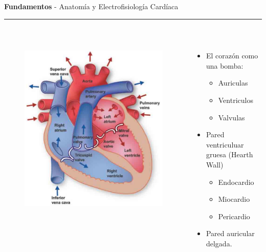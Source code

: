 \documentclass[11pt]{beamer}
\begin{document}
	\begin{frame}[t]
		\vspace*{0.5 cm} \textbf{Fundamentos} - Anatomía y Electrofisiología Cardíaca \\
		\color{brown}\rule{\linewidth}{4pt} \\ [0.5 cm]
		\begin{columns}[T] %
			\begin{column}{.48\textwidth}
				\begin{figure}
					\centering
					\includegraphics[height= 4.5 cm]{fig/fundamentals-corazon}
				\end{figure}
			\end{column}%
			\hfill%
			\begin{column}{.6\textwidth}
				\begin{itemize}
					\item El corazón como una bomba:
					\begin{itemize}
						\item Auriculas
						\item Ventriculos
						\item Valvulas
					\end{itemize}						
					\item Pared ventriculuar gruesa (Hearth Wall)
					\begin{itemize}
						\item Endocardio
						\item Miocardio
						\item Pericardio
					\end{itemize}
					\item Pared auricular delgada.					
				\end{itemize}
			\end{column}%
		\end{columns}		
	\end{frame}
	
\end{document}
